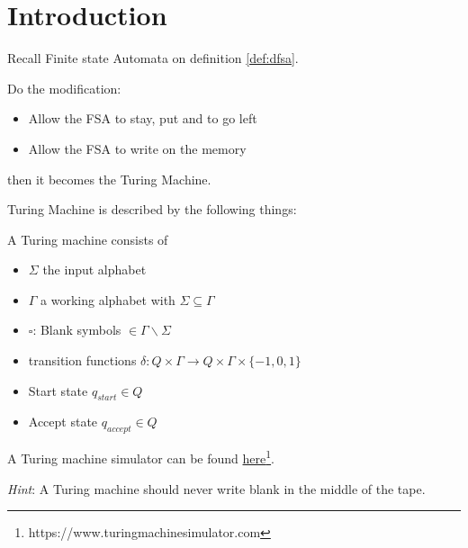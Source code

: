 \section{Introduction}

Recall Finite state Automata on definition \ref{def:dfsa}.

Do the modification:
\begin{itemize}
\item
  Allow the FSA to stay, put and to go left
\item
  Allow the FSA to write on the memory
\end{itemize}

then it becomes the Turing Machine.

Turing Machine is described by the following things:

\begin{definition} A Turing machine consists of 
\begin{itemize}
\item
  \(\Sigma\) the input alphabet
\item
  \(\Gamma\) a working alphabet with \(\Sigma \subseteq \Gamma\)
\item
  \(\square\): Blank symbols \(\in \Gamma \backslash \Sigma\)
\item
  transition functions
  \(\delta: Q\times \Gamma \rightarrow Q \times \Gamma \times \{-1,0,1\}\)
\item
  Start state \(q_{start} \in Q\)
\item
  Accept state \(q_{accept} \in Q\)
\end{itemize}
\end{definition}


A Turing machine simulator can be found \href{https://www.turingmachinesimulator.com}{here}\footnote{https://www.turingmachinesimulator.com}.

\emph{Hint}: A Turing machine should never write blank in the middle of the
tape.